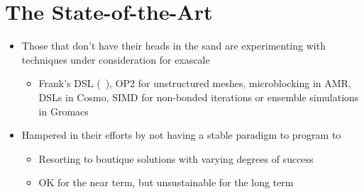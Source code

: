 \section{The State-of-the-Art}
\begin{itemize}
  \item Those that don't have their heads in the sand are experimenting with techniques under consideration for exascale
    \begin{itemize}
      \item Frank's DSL (\hipacc~\cite{MHTKE12a}), OP2 for unstructured meshes, microblocking in AMR, DSLs in Cosmo, SIMD for non-bonded iterations or ensemble
     simulations in Gromacs 
    \end{itemize}
  \item Hampered in their efforts by not having a stable paradigm to program to 
    \begin{itemize}
      \item Resorting to boutique solutions with varying degrees of success
      \item OK for the near term, but unsustainable for the long term
    \end{itemize}
\end{itemize}


